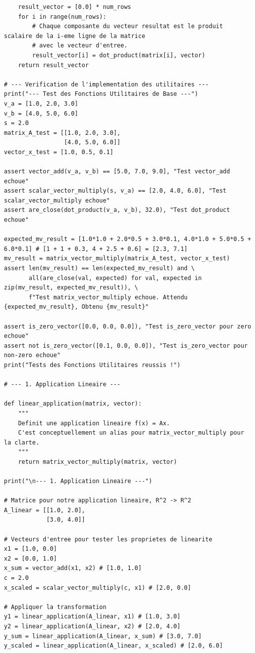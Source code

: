 \documentclass{report}
\begin{document}
\begin{verbatim}
    result_vector = [0.0] * num_rows
    for i in range(num_rows):
        # Chaque composante du vecteur resultat est le produit scalaire de la i-eme ligne de la matrice
        # avec le vecteur d'entree.
        result_vector[i] = dot_product(matrix[i], vector)
    return result_vector

# --- Verification de l'implementation des utilitaires ---
print("--- Test des Fonctions Utilitaires de Base ---")
v_a = [1.0, 2.0, 3.0]
v_b = [4.0, 5.0, 6.0]
s = 2.0
matrix_A_test = [[1.0, 2.0, 3.0],
                 [4.0, 5.0, 6.0]]
vector_x_test = [1.0, 0.5, 0.1]

assert vector_add(v_a, v_b) == [5.0, 7.0, 9.0], "Test vector_add echoue"
assert scalar_vector_multiply(s, v_a) == [2.0, 4.0, 6.0], "Test scalar_vector_multiply echoue"
assert are_close(dot_product(v_a, v_b), 32.0), "Test dot_product echoue"

expected_mv_result = [1.0*1.0 + 2.0*0.5 + 3.0*0.1, 4.0*1.0 + 5.0*0.5 + 6.0*0.1] # [1 + 1 + 0.3, 4 + 2.5 + 0.6] = [2.3, 7.1]
mv_result = matrix_vector_multiply(matrix_A_test, vector_x_test)
assert len(mv_result) == len(expected_mv_result) and \
       all(are_close(val, expected) for val, expected in zip(mv_result, expected_mv_result)), \
       f"Test matrix_vector_multiply echoue. Attendu {expected_mv_result}, Obtenu {mv_result}"

assert is_zero_vector([0.0, 0.0, 0.0]), "Test is_zero_vector pour zero echoue"
assert not is_zero_vector([0.1, 0.0, 0.0]), "Test is_zero_vector pour non-zero echoue"
print("Tests des Fonctions Utilitaires reussis !")

# --- 1. Application Lineaire ---

def linear_application(matrix, vector):
    """
    Definit une application lineaire f(x) = Ax.
    C'est conceptuellement un alias pour matrix_vector_multiply pour la clarte.
    """
    return matrix_vector_multiply(matrix, vector)

print("\n--- 1. Application Lineaire ---")

# Matrice pour notre application lineaire, R^2 -> R^2
A_linear = [[1.0, 2.0],
            [3.0, 4.0]]

# Vecteurs d'entree pour tester les proprietes de linearite
x1 = [1.0, 0.0]
x2 = [0.0, 1.0]
x_sum = vector_add(x1, x2) # [1.0, 1.0]
c = 2.0
x_scaled = scalar_vector_multiply(c, x1) # [2.0, 0.0]

# Appliquer la transformation
y1 = linear_application(A_linear, x1) # [1.0, 3.0]
y2 = linear_application(A_linear, x2) # [2.0, 4.0]
y_sum = linear_application(A_linear, x_sum) # [3.0, 7.0]
y_scaled = linear_application(A_linear, x_scaled) # [2.0, 6.0]


\end{verbatim}
\end{document}
